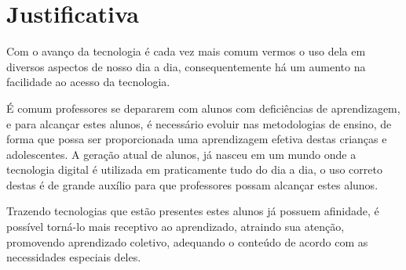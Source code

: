 \section{Justificativa}

Com o avanço da tecnologia é cada vez mais comum vermos o uso dela em diversos aspectos de nosso dia a dia, consequentemente há um aumento na facilidade ao acesso da tecnologia. 

É comum professores se depararem com alunos com deficiências de aprendizagem, e para alcançar estes alunos, é necessário evoluir nas metodologias de ensino, de forma que possa ser proporcionada uma aprendizagem efetiva destas crianças e adolescentes. A geração atual de alunos, já nasceu em um mundo onde a tecnologia digital é utilizada em praticamente tudo do dia a dia, o uso correto destas é de grande auxílio para que professores possam alcançar estes alunos. 

Trazendo tecnologias que estão presentes estes alunos já possuem afinidade, é possível torná-lo mais receptivo ao aprendizado, atraindo sua atenção, promovendo aprendizado coletivo, adequando o conteúdo de acordo com as necessidades especiais deles. 
